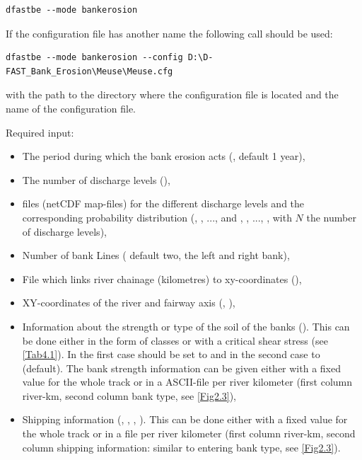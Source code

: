 \begin{Verbatim}
dfastbe --mode bankerosion
\end{Verbatim}

If the configuration file has another name the following call should be used:

\begin{Verbatim}
dfastbe --mode bankerosion --config D:\D-FAST_Bank_Erosion\Meuse\Meuse.cfg
\end{Verbatim}

with  the path to the directory where the configuration file is located and  the name of the configuration file.

Required input:

\begin{itemize}
\item The period during which the bank erosion acts (, default 1 year),
\item The number of discharge levels (),
\item \dflowfm files (netCDF map-files) for the different discharge levels and the corresponding probability distribution (, , ...,  and , , ..., , with $N$ the number of discharge levels),
\item Number of bank Lines ( default two, the left and right bank),
\item File which links river chainage (kilometres) to xy-coordinates (),
\item XY-coordinates of the river and fairway axis (, ),
\item Information about the strength or type of the soil of the banks ().
This can be done either in the form of classes or with a critical shear stress (see \autoref{Tab4.1}).
In the first case  should be set to  and in the second case to  (default).
The bank strength information can be given either with a fixed value for the whole track or in a ASCII-file per river kilometer (first column river-km, second column bank type, see \autoref{Fig2.3}),
\item Shipping information (, , , ).
This can be done either with a fixed value for the whole track or in a file per river kilometer (first column river-km, second column shipping information: similar to entering bank type, see \autoref{Fig2.3}).
\end{itemize}

